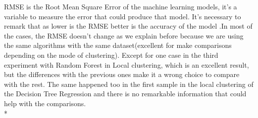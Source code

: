 RMSE is the Root Mean Square Error of the machine learning models, it's a variable to measure the error that could produce that model. It's necessary to remark that as lower is the RMSE better is the accuracy of the model .In most of the cases, the RMSE doesn't change as we explain before because we are using the same algorithms with the same dataset(excellent for make comparisons depending on the mode of clustering). Except for one case in the third experiment with Random Forest in Local clustering, which is an excellent result, but the differences with the previous ones make it a wrong choice to compare with the rest. The same happened too in the first sample in the local clustering of the Decision Tree Regression and there is no remarkable information that could help with the comparisons.\\*

